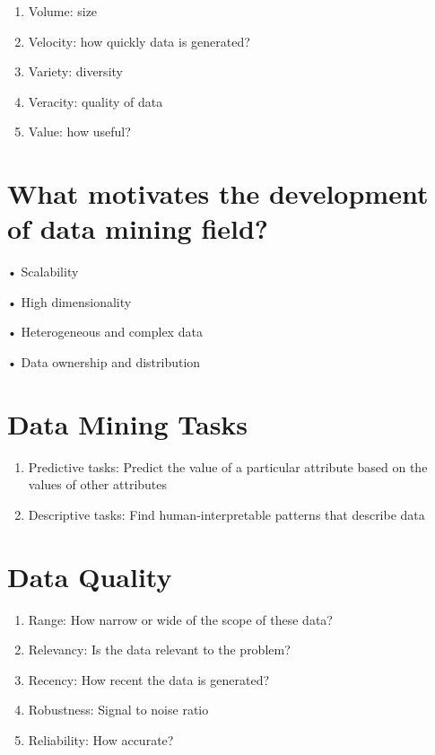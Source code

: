 \documentclass[
  letterpaper,
  DIV=11,
  numbers=noendperiod]{scrreprt}
\begin{document}
\begin{enumerate}
\def\labelenumi{\arabic{enumi}.}
\item
  Volume: size
\item
  Velocity: how quickly data is generated?
\item
  Variety: diversity
\item
  Veracity: quality of data
\item
  Value: how useful?
\end{enumerate}

\section{What motivates the development of data mining
field?}\label{what-motivates-the-development-of-data-mining-field}

• Scalability

• High dimensionality

• Heterogeneous and complex data

• Data ownership and distribution

\section{Data Mining Tasks}\label{data-mining-tasks}

\begin{enumerate}
\def\labelenumi{\arabic{enumi}.}
\item
  Predictive tasks: Predict the value of a particular attribute based on
  the values of other attributes
\item
  Descriptive tasks: Find human-interpretable patterns that describe
  data
\end{enumerate}

\section{Data Quality}\label{data-quality}

\begin{enumerate}
\def\labelenumi{\arabic{enumi}.}
\item
  Range: How narrow or wide of the scope of these data?
\item
  Relevancy: Is the data relevant to the problem?
\item
  Recency: How recent the data is generated?
\item
  Robustness: Signal to noise ratio
\item
  Reliability: How accurate?
\end{enumerate}
\end{document}
